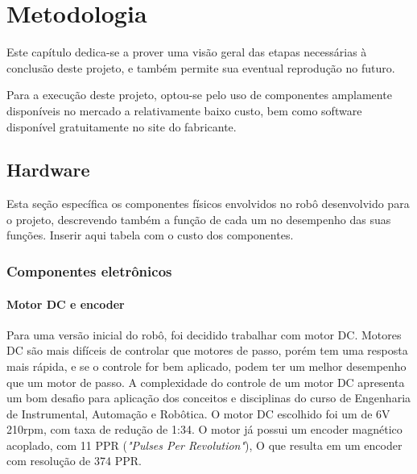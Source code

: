 
\chapter{Metodologia}

{\color{red}Este capítulo dedica-se a prover uma visão geral das etapas necessárias à conclusão deste projeto, e também
permite sua eventual reprodução no futuro.}

Para a execução deste projeto, optou-se pelo uso de componentes amplamente disponíveis no mercado a relativamente baixo
custo, bem como software disponível gratuitamente no site do fabricante.


\section{Hardware}
{\color{red} Esta seção específica os componentes físicos envolvidos no robô desenvolvido para o projeto, descrevendo
também a função de cada um no desempenho das suas funções.}
{\color{red} Inserir aqui tabela com o custo dos componentes.}


\subsection{Componentes eletrônicos}

\subsubsection{Motor DC e encoder}
Para uma versão inicial do robô, foi decidido trabalhar com motor DC.
Motores DC são mais difíceis de controlar que motores de passo, porém tem uma resposta mais rápida, e se o controle for bem aplicado, podem ter um melhor desempenho que um motor de passo.
A complexidade do controle de um motor DC apresenta um bom desafio para aplicação dos conceitos e disciplinas do curso de Engenharia de Instrumental, Automação e Robôtica.
O motor DC escolhido foi um de 6V 210rpm, com taxa de redução de 1:34. O motor já possui um encoder magnético acoplado, com 11 PPR (\textit{"Pulses Per Revolution"}),
O que resulta em um encoder com resolução de 374 PPR.

